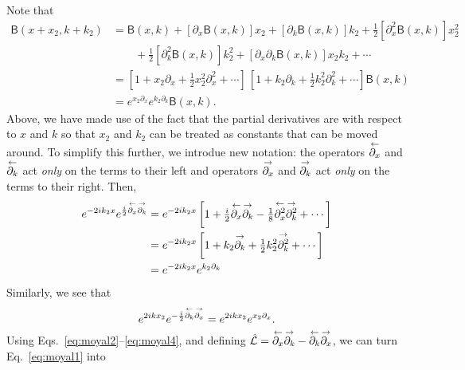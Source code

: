 Note that
%
\begin{equation}
  \begin{aligned}
    \mathsf{B}(x + x_{2}, k + k_{2}) &= \mathsf{B}(x, k) + [\partial_{x} \mathsf{B}(x, k)]x_{2} + [\partial_{k} \mathsf{B}(x, k)] k_{2} + \tfrac{1}{2} [\partial^{2}_{x} \mathsf{B}(x, k)] x_{2}^{2}\\
    &\qquad + \tfrac{1}{2} [\partial^{2}_{k} \mathsf{B}(x, k)] k_{2}^{2} + [\partial_{x}\partial_{k} \mathsf{B}(x, k)] x_{2}k_{2} + \cdots \\
    &= \left[1 + x_{2}\partial_{x} + \tfrac{1}{2}x_{2}^{2}\partial^{2}_{x} + \cdots \right]\,
  \left[1 + k_{2}\partial_{k} + \tfrac{1}{2}k_{2}^{2}\partial^{2}_{k} + \cdots \right] \mathsf{B}(x, k)\\
    &= e^{x_{2}\partial_{x}} e^{k_{2}\partial_{k}} \mathsf{B}(x, k).\label{eq:moyal2}
  \end{aligned}
\end{equation}
%
Above, we have made use of the fact that the partial derivatives are with respect to $x$ and $k$ so that $x_{2}$ and $k_{2}$ can be treated as constants that can be moved around.
To simplify this further, we introdue new notation: the operators $\overset{\gets}{\partial_{x}}$ and $\overset{\gets}{\partial_{k}}$ act \emph{only} on the terms to their left and operators $\overset{\to}{\partial_{x}}$ and $\overset{\to}{\partial_{k}}$ act \emph{only} on the terms to their right.
Then,
%
\begin{equation}
  \begin{aligned}
    e^{-2ik_{2}x} e^{\frac{i}{2}\overset{\gets}{\partial_{x}}\overset{\to}{\partial_{k}}} &= e^{-2ik_{2}x} \left[1 +  \tfrac{i}{2}\overset{\gets}{\partial_{x}}\overset{\to}{\partial_{k}} - \tfrac{1}{8}\overset{\gets}{\partial^{2}_{x}}\overset{\to}{\partial^{2}_{k}} + \cdots \right]\\
                                                            &= e^{-2ik_{2}x} \left[1 +  k_{2}\overset{\to}{\partial_{k}} + \tfrac{1}{2}k_{2}^{2}\overset{\to}{\partial^{2}_{k}} + \cdots \right]\\
                                                            &= e^{-2ik_{2}x}e^{k_{2}\partial_{k}}
  \end{aligned}\label{eq:moyal3}
\end{equation}
%
Similarly, we see that
%
\begin{equation}
  e^{2ikx_{2}}e^{-\frac{i}{2}\overset{\gets}{\partial_{k}}\overset{\to}{\partial_{x}}} = e^{2ikx_{2}}e^{x_{2}\partial_{x}}.\label{eq:moyal4}
\end{equation}
%
Using Eqs.~\eqref{eq:moyal2}--\eqref{eq:moyal4}, and defining $\hat{\mathcal{L}} = \overset{\gets}{\partial_{x}} \overset{\to}{\partial_{k}} - \overset{\gets}{\partial_{k}}\overset{\to}{\partial_{x}}$, we can turn Eq.~\eqref{eq:moyal1} into
